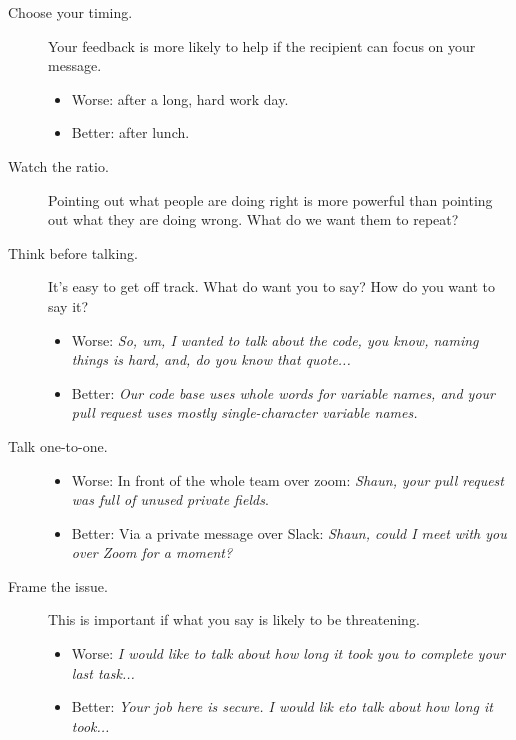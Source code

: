 \documentclass{article}
\begin{document}
\begin{tiny}
\begin{multicols}{3}
\begin{tcolorbox}
        \begin{description}
            \item[Choose your timing.] Your feedback is more likely to help if the recipient can focus on your message.
                \begin{itemize}
                    \item Worse: after a long, hard work day.
                    \item Better: after lunch.
                \end{itemize}
            \item[Watch the ratio.] Pointing out what people are doing right is more powerful than pointing out what they are doing wrong. What do we want them to repeat?
            \item[Think before talking.] It's easy to get off track. What do want you to say? How do you want to say it?
                \begin{itemize}
                    \item Worse: \emph{So, um, I wanted to talk about the code, you know, naming things is hard, and, do you know that quote...}                    
                    \item Better: \emph{Our code base uses whole words for variable names, and your pull request uses mostly single-character variable names.}
                \end{itemize}
            \item[Talk one-to-one.] 
                \begin{itemize}
                    \item Worse: In front of the whole team over zoom: \emph{Shaun, your pull request was full of unused private fields}.
                    \item Better: Via a private message over Slack: \emph{Shaun, could I meet with you over Zoom for a moment?}
                \end{itemize}
            \item[Frame the issue.] This is important if what you say is likely to be threatening.
                \begin{itemize}
                   \item Worse: \emph{I would like to talk about how long it took you to complete your last task... }
                   \item Better: \emph{Your job here is secure. I would lik eto talk about how long it took... }
                \end{itemize}

\end{description}
\end{tcolorbox}
\end{multicols}
\end{tiny}
\end{document}
